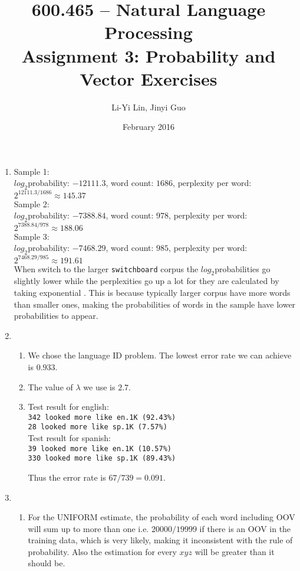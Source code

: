 \documentclass[10pt]{article}
\title{600.465 -- Natural Language Processing\\
Assignment 3: Probability and Vector Exercises}
\author{Li-Yi Lin, Jinyi Guo}
\date{February 2016}
\begin{document}
\maketitle
\begin{enumerate}
    \item  %
    Sample 1:\\ $log_2$probability: $-12111.3$, word count: $1686$, perplexity per word: $2^{12111.3/1686} \approx 145.37$\\
    Sample 2:\\ $log_2$probability: $-7388.84$, word count: $978$, perplexity per word: $2^{7388.84/978} \approx 188.06$\\
    Sample 3:\\ $log_2$probability: $-7468.29$, word count: $985$, perplexity per word: $2^{7468.29/985} \approx 191.61$\\
    
    When switch to the larger {\tt switchboard} corpus the $log_2$probabilities go slightly lower while the perplexities go up a lot for they are calculated by taking exponential . This is because typically larger corpus have more words than smaller ones, making the probabilities of words in the sample have lower probabilities to appear. 
    
     \addtocounter{enumi}{1}
     \item %
        \begin{enumerate}
            \item
            We chose the language ID problem. The lowest error rate we can achieve is $0.933$.
            \item
            The value of $\lambda$ we use is $2.7$.
            \item
            Test result for english:\\
            \texttt{342 looked more like en.1K (92.43\%)\\
            28 looked more like sp.1K (7.57\%)  }\\
            
            Test result for spanish:\\
            \texttt{39 looked more like en.1K (10.57\%)\\
            330 looked more like sp.1K (89.43\%) }
            
            Thus the error rate is $67/739 = 0.091$.
        \end{enumerate}
    \item %
        \begin{enumerate}
            \item
            For the UNIFORM estimate, the probability of each word including OOV will sum up to
            more than one i.e. $20000/19999$ if there is an OOV in the training data, which
            is very likely, making it inconsistent with the rule of probability. Also the
            estimation for every $xyz$ will be greater than it should be.
                   

\end{enumerate}
\end{enumerate}
\end{document}
